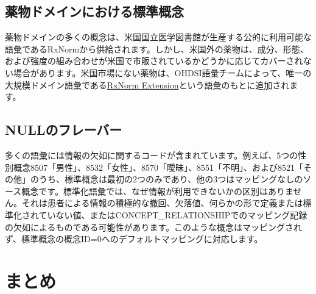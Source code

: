\documentclass[
  11pt]{book}
\theoremstyle{definition}
\theoremstyle{definition}
\theoremstyle{definition}
\theoremstyle{definition}
\theoremstyle{remark}
\begin{document}
\subsection{薬物ドメインにおける標準概念}\label{rxNormExtension}

薬物ドメインの多くの概念は、米国国立医学図書館が生産する公的に利用可能な語彙であるRxNormから供給されます。しかし、米国外の薬物は、成分、形態、および強度の組み合わせが米国で市販されているかどうかに応じてカバーされない場合があります。米国市場にない薬物は、OHDSI語彙チームによって、唯一の大規模ドメイン語彙である\href{https://www.ohdsi.org/web/wiki/doku.php?id=documentation:vocabulary:rxnorm_extension}{RxNorm Extension}という語彙のもとに追加されます。

\subsection{NULLのフレーバー}\label{nullux306eux30d5ux30ecux30fcux30d0ux30fc}

多くの語彙には情報の欠如に関するコードが含まれています。例えば、5つの性別概念8507「男性」、8532「女性」、8570「曖昧」、8551「不明」、および8521「その他」のうち、標準概念は最初の2つのみであり、他の3つはマッピングなしのソース概念です。標準化語彙では、なぜ情報が利用できないかの区別はありません。それは患者による情報の積極的な撤回、欠落値、何らかの形で定義または標準化されていない値、またはCONCEPT\_RELATIONSHIPでのマッピング記録の欠如によるものである可能性があります。このような概念はマッピングされず、標準概念の概念ID=0へのデフォルトマッピングに対応します。

\section{まとめ}\label{ux307eux3068ux3081-3}
\end{document}
